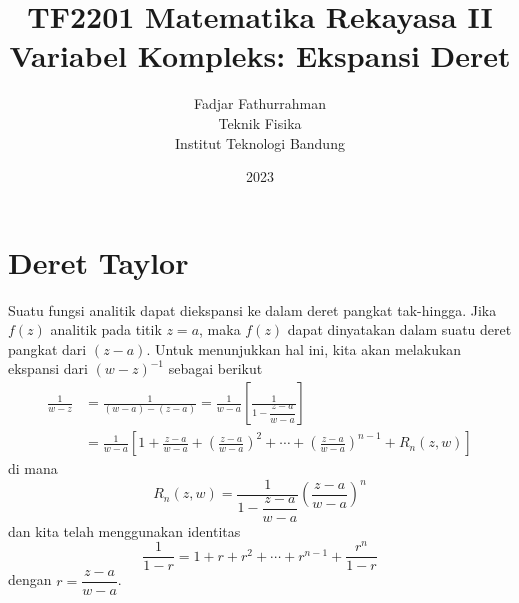



\title{%
{\small TF2201 Matematika Rekayasa II}\\
Variabel Kompleks: Ekspansi Deret
}
\author{Fadjar Fathurrahman\\
Teknik Fisika\\
Institut Teknologi Bandung}
\date{2023}
\maketitle


\section{Deret Taylor}

Suatu fungsi analitik dapat diekspansi ke dalam deret pangkat tak-hingga.
Jika $f(z)$ analitik pada titik $z=a$, maka $f(z)$ dapat dinyatakan dalam suatu
deret pangkat dari $(z-a)$.
Untuk menunjukkan hal ini, kita akan melakukan
ekspansi dari $(w-z)^{-1}$ sebagai berikut
\begin{align*}
\frac{1}{w-z} & =\frac{1}{(w-a)-(z-a)} = \frac{1}{w-a}\left[\frac{1}{1-\dfrac{z-a}{w-a}}\right]\\
 & =\frac{1}{w-a}\left[1 + \frac{z-a}{w-a} + \left(\frac{z-a}{w-a}\right)^{2}+\cdots+\left(\frac{z-a}{w-a}\right)^{n-1}+R_{n}(z,w)\right]
\end{align*}
di mana
\begin{equation*}
R_{n}(z,w)=\frac{1}{1-\dfrac{z-a}{w-a}}\left(\frac{z-a}{w-a}\right)^{n}
\end{equation*}
dan kita telah menggunakan identitas
\begin{equation}
\frac{1}{1-r}=1+r+r^{2}+\cdots+r^{n-1}+\frac{r^{n}}{1-r}
\end{equation}
dengan $r = \dfrac{z-a}{w-a}$.

